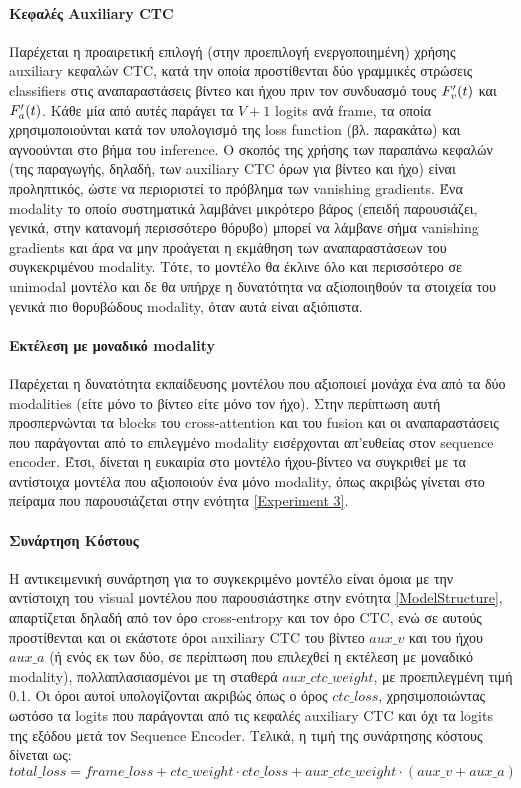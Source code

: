 \paragraph{Κεφαλές Auxiliary CTC}
Παρέχεται η προαιρετική επιλογή (στην προεπιλογή ενεργοποιημένη) χρήσης auxiliary κεφαλών CTC, κατά την οποία προστίθενται δύο γραμμικές στρώσεις classifiers στις αναπαραστάσεις βίντεο και ήχου πριν τον συνδυασμό τους $F_v\sp{\prime}(t)$ και $F_a\sp{\prime}(t)$. Κάθε μία από αυτές παράγει τα $V+1$ logits ανά frame, τα οποία χρησιμοποιούνται κατά τον υπολογισμό της loss function (βλ. παρακάτω) και αγνοούνται στο βήμα του inference. Ο σκοπός της χρήσης των παραπάνω κεφαλών (της παραγωγής, δηλαδή, των auxiliary CTC όρων για βίντεο και ήχο) είναι προληπτικός, ώστε να περιοριστεί το πρόβλημα των vanishing gradients. Ένα modality το οποίο συστηματικά λαμβάνει μικρότερο βάρος (επειδή παρουσιάζει, γενικά, στην κατανομή περισσότερο θόρυβο) μπορεί να λάμβανε σήμα vanishing gradients και άρα να μην προάγεται η εκμάθηση των αναπαραστάσεων του συγκεκριμένου modality. Τότε, το μοντέλο θα έκλινε όλο και περισσότερο σε unimodal μοντέλο και δε θα υπήρχε η δυνατότητα να αξιοποιηθούν τα στοιχεία του γενικά πιο θορυβώδους modality, όταν αυτά είναι αξιόπιστα.

\paragraph{Εκτέλεση με μοναδικό modality}
Παρέχεται η δυνατότητα εκπαίδευσης μοντέλου που αξιοποιεί μονάχα ένα από τα δύο modalities (είτε μόνο το βίντεο είτε μόνο τον ήχο). Στην περίπτωση αυτή προσπερνώνται τα blocks του cross-attention και του fusion και οι αναπαραστάσεις που παράγονται από το επιλεγμένο modality εισέρχονται απ'ευθείας στον sequence encoder. Έτσι, δίνεται η ευκαιρία στο μοντέλο ήχου-βίντεο να συγκριθεί με τα αντίστοιχα μοντέλα που αξιοποιούν ένα μόνο modality, όπως ακριβώς γίνεται στο πείραμα που παρουσιάζεται στην ενότητα \ref{Experiment 3}.

\paragraph{Συνάρτηση Κόστους}
Η αντικειμενική συνάρτηση για το συγκεκριμένο μοντέλο είναι όμοια με την αντίστοιχη του visual μοντέλου που παρουσιάστηκε στην ενότητα \ref{ModelStructure}, απαρτίζεται δηλαδή από τον όρο cross-entropy και τον όρο CTC, ενώ σε αυτούς προστίθενται και οι εκάστοτε όροι auxiliary CTC του βίντεο $aux\_v$ και του ήχου $aux\_a$ (ή ενός εκ των δύο, σε περίπτωση που επιλεχθεί η εκτέλεση με μοναδικό modality), πολλαπλασιασμένοι με τη σταθερά $aux\_ctc\_weight$, με προεπιλεγμένη τιμή 0.1. Οι όροι αυτοί υπολογίζονται ακριβώς όπως ο όρος $ctc\_loss$, χρησιμοποιώντας ωστόσο τα logits που παράγονται από τις κεφαλές auxiliary CTC και όχι τα logits της εξόδου μετά τον Sequence Encoder. Τελικά, η τιμή της συνάρτησης κόστους δίνεται ως:
\[
total\_loss = frame\_loss + ctc\_weight \cdot ctc\_loss + aux\_ctc\_weight \cdot (aux\_v + aux\_a)
\]
